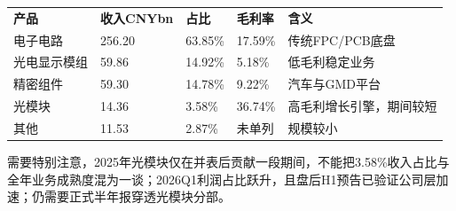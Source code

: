 \begin{exhibitbox}
\begin{tabularx}{\exhibitboxwidth}{L{3.4cm}R{2.2cm}R{2.0cm}R{2.0cm}X}
\textbf{产品} & \textbf{收入CNYbn} & \textbf{占比} & \textbf{毛利率} & \textbf{含义} \\
电子电路 & 256.20 & 63.85\% & 17.59\% & 传统FPC/PCB底盘 \\
光电显示模组 & 59.86 & 14.92\% & 5.18\% & 低毛利稳定业务 \\
精密组件 & 59.30 & 14.78\% & 9.22\% & 汽车与GMD平台 \\
光模块 & 14.36 & 3.58\% & 36.74\% & 高毛利增长引擎，期间较短 \\
其他 & 11.53 & 2.87\% & 未单列 & 规模较小 \\
\end{tabularx}
\end{exhibitbox}

需要特别注意，2025年光模块仅在并表后贡献一段期间，不能把3.58\%收入占比与全年业务成熟度混为一谈；2026Q1利润占比跃升，且盘后H1预告已验证公司层加速；仍需要正式半年报穿透光模块分部。
